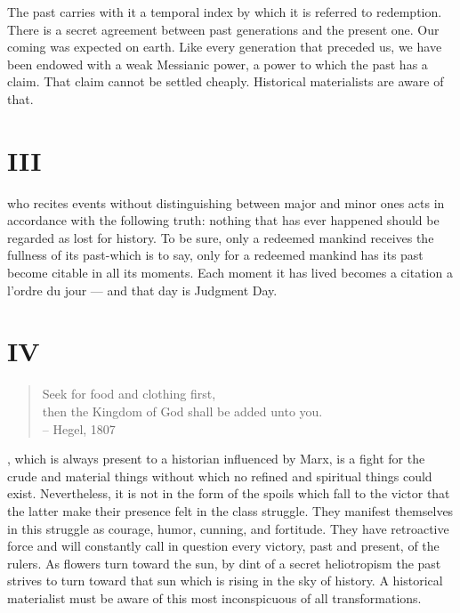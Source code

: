 \documentclass[12pt]{tufte-handout}
\begin{document}
The past carries with it a temporal index by which it is referred to redemption. There is a secret agreement between past generations and the present one. Our coming was expected on earth. Like every generation that preceded us, we have been endowed with a weak Messianic power, a power to which the past has a claim. That claim cannot be settled cheaply. Historical materialists are aware of that.	 


\section{III}

 who recites events without distinguishing between major and minor ones acts in accordance with the following truth: nothing that has ever happened should be regarded as lost for history. To be sure, only a redeemed mankind receives the fullness of its past-which is to say, only for a redeemed mankind has its past become citable in all its moments. Each moment it has lived becomes a citation a l'ordre du jour — and that day is Judgment Day.	 

\section{IV}	 
 	
\begin{quote}
Seek for food and clothing first, \\ then
the Kingdom of God shall be added unto you.\\
-- Hegel, 1807\\
\end{quote}
 	 	 
, which is always present to a historian influenced by Marx, is a fight for the crude and material things without which no refined and spiritual things could exist. Nevertheless, it is not in the form of the spoils which fall to the victor that the latter make their presence felt in the class struggle. They manifest themselves in this struggle as courage, humor, cunning, and fortitude. They have retroactive force and will constantly call in question every victory, past and present, of the rulers. As flowers turn toward the sun, by dint of a secret heliotropism the past strives to turn toward that sun which is rising in the sky of history. A historical materialist must be aware of this most inconspicuous of all transformations.	 
 	 	 
\end{document}
